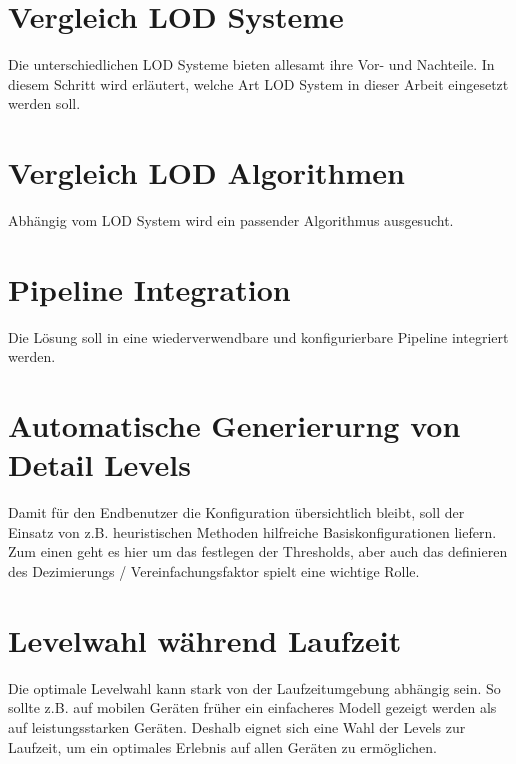 \section{Vergleich LOD Systeme}
Die unterschiedlichen LOD Systeme bieten allesamt ihre Vor- und Nachteile. In diesem Schritt wird erläutert, welche Art LOD System in dieser Arbeit eingesetzt werden soll.

\section{Vergleich LOD Algorithmen}
Abhängig vom LOD System wird ein passender Algorithmus ausgesucht.

\section{Pipeline Integration}
Die Lösung soll in eine wiederverwendbare und konfigurierbare Pipeline integriert werden.

\section{Automatische Generierurng von Detail Levels}
Damit für den Endbenutzer die Konfiguration übersichtlich bleibt, soll der Einsatz von z.B. heuristischen Methoden hilfreiche Basiskonfigurationen liefern.
Zum einen geht es hier um das festlegen der Thresholds, aber auch das definieren des Dezimierungs / Vereinfachungsfaktor spielt eine wichtige Rolle.

\section{Levelwahl während Laufzeit}
Die optimale Levelwahl kann stark von der Laufzeitumgebung abhängig sein. So sollte z.B. auf mobilen Geräten früher ein einfacheres Modell gezeigt werden als auf leistungsstarken Geräten.
Deshalb eignet sich eine Wahl der Levels zur Laufzeit, um ein optimales Erlebnis auf allen Geräten zu ermöglichen.

